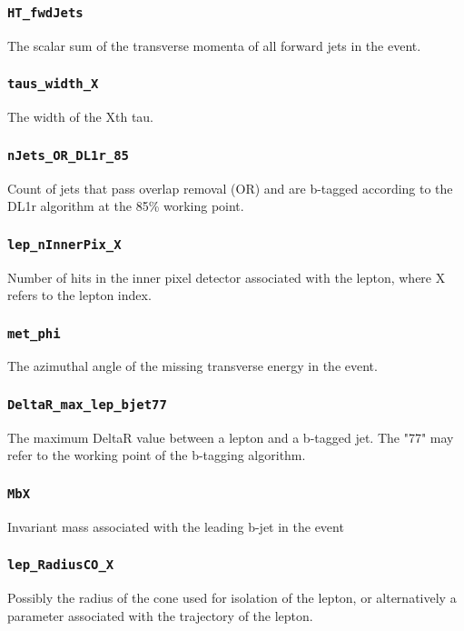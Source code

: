 \subsubsection{\texttt{HT\_fwdJets}} The scalar sum of the transverse momenta of all forward jets in the event.

\subsubsection{\texttt{taus\_width\_X}} The width of the Xth tau.

\subsubsection{\texttt{nJets\_OR\_DL1r\_85}} Count of jets that pass overlap removal (OR) and are b-tagged according to the
DL1r algorithm at the 85\% working point.

\subsubsection{\texttt{lep\_nInnerPix\_X}} Number of hits in the inner pixel detector associated with the lepton, where X
refers to the lepton index.

\subsubsection{\texttt{met\_phi}} The azimuthal angle of the missing transverse energy in the event.

\subsubsection{\texttt{DeltaR\_max\_lep\_bjet77}} The maximum DeltaR value between a lepton and a b-tagged jet. The "77"
may refer to the working point of the b-tagging algorithm.

\subsubsection{\texttt{MbX}} Invariant mass associated with the leading b-jet in the event

\subsubsection{\texttt{lep\_RadiusCO\_X}} Possibly the radius of the cone used for isolation of the lepton, or
alternatively a parameter associated with the trajectory of the lepton.

